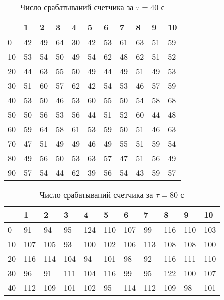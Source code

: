 \documentclass[a4paper]{article}
\begin{document}
\begin{table}[!h]
\begin{center}
\begin{tabular}{|l|l|l|l|l|l|l|l|l|l|l|}
\hline
   & 1  & 2  & 3  & 4  & 5  & 6  & 7  & 8  & 9  & 10 \\ \hline
0  & 42 & 49 & 64 & 30 & 42 & 53 & 61 & 63 & 51 & 59 \\ \hline
10 & 53 & 54 & 50 & 49 & 54 & 62 & 48 & 62 & 51 & 52 \\ \hline
20 & 44 & 63 & 55 & 50 & 49 & 44 & 49 & 51 & 49 & 53 \\ \hline
30 & 51 & 60 & 57 & 62 & 42 & 54 & 53 & 46 & 57 & 59 \\ \hline
40 & 53 & 50 & 46 & 53 & 60 & 55 & 50 & 54 & 58 & 68 \\ \hline
50 & 50 & 56 & 53 & 56 & 44 & 51 & 52 & 60 & 44 & 48 \\ \hline
60 & 59 & 64 & 58 & 61 & 53 & 59 & 50 & 51 & 46 & 63 \\ \hline
70 & 47 & 51 & 49 & 49 & 46 & 49 & 55 & 51 & 59 & 54 \\ \hline
80 & 49 & 56 & 50 & 53 & 63 & 57 & 47 & 51 & 56 & 49 \\ \hline
90 & 57 & 54 & 44 & 62 & 39 & 56 & 54 & 43 & 59 & 57 \\ \hline
\end{tabular}
\caption{Число срабатываний счетчика за $\tau = 40$ с}
\end{center}
\end{table}

\begin{table}[!h]
\begin{center}
\begin{tabular}{|l|l|l|l|l|l|l|l|l|l|l|}
\hline
   & 1  & 2  & 3  & 4  & 5  & 6  & 7  & 8  & 9  & 10 \\ \hline
0  & 91 & 94 & 95 & 124 & 110 & 107 & 99 & 116 & 110 & 103 \\ \hline
10 & 107 & 105 & 93 & 100 & 102 & 106 & 113 & 108 & 108 & 100 \\ \hline
20 & 116 & 114 & 104 & 94 & 101 & 98 & 92 & 116 & 111 & 110 \\ \hline
30 & 96 & 91 & 111 & 104 & 116 & 99 & 95 & 122 & 100 & 107 \\ \hline
40 & 112 & 109 & 101 & 102 & 95 & 114 & 112 & 109 & 98 & 101 \\ \hline
\end{tabular}
\caption{Число срабатываний счетчика за $\tau = 80$ с}
\end{center}
\end{table}
\end{document}
